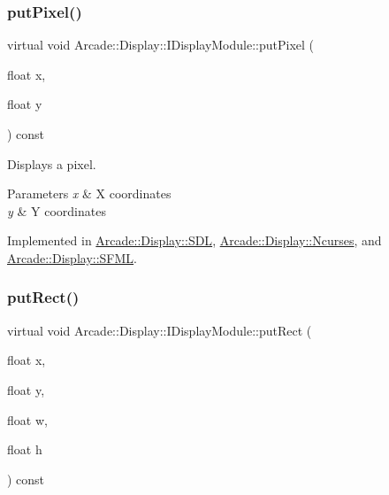 \mbox{\label{classArcade_1_1Display_1_1IDisplayModule_a86a61eaa1d0cf2ddfdedbaa04054da90}} 
\subsubsection{\texorpdfstring{putPixel()}{putPixel()}}
{\footnotesize\ttfamily virtual void Arcade\+::\+Display\+::\+I\+Display\+Module\+::put\+Pixel (\begin{DoxyParamCaption}\item[{float}]{x,  }\item[{float}]{y }\end{DoxyParamCaption}) const\hspace{0.3cm}{\ttfamily [pure virtual]}}



Displays a pixel. 


\begin{DoxyParams}{Parameters}
{\em x} & X coordinates \\
\hline
{\em y} & Y coordinates \\
\hline
\end{DoxyParams}


Implemented in \mbox{\hyperlink{classArcade_1_1Display_1_1SDL_a5c3f965b3394c9654f3537cab1201c1c}{Arcade\+::\+Display\+::\+S\+DL}}, \mbox{\hyperlink{classArcade_1_1Display_1_1Ncurses_a78be67c84498f97a781906f17f3e5f61}{Arcade\+::\+Display\+::\+Ncurses}}, and \mbox{\hyperlink{classArcade_1_1Display_1_1SFML_a68417ef6b0450c6c7e6fa022699a2c3b}{Arcade\+::\+Display\+::\+S\+F\+ML}}.

\mbox{\label{classArcade_1_1Display_1_1IDisplayModule_a4c4072d7444006b9a0ba134c684e58b5}} 
\subsubsection{\texorpdfstring{putRect()}{putRect()}}
{\footnotesize\ttfamily virtual void Arcade\+::\+Display\+::\+I\+Display\+Module\+::put\+Rect (\begin{DoxyParamCaption}\item[{float}]{x,  }\item[{float}]{y,  }\item[{float}]{w,  }\item[{float}]{h }\end{DoxyParamCaption}) const\hspace{0.3cm}{\ttfamily [pure virtual]}}




